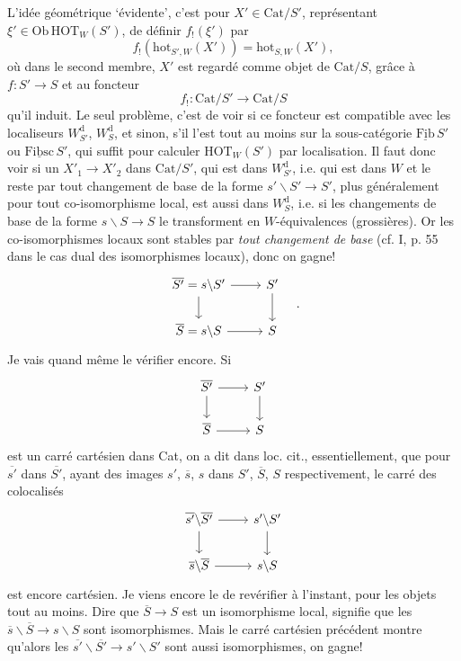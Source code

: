 \documentclass[11pt]{article}
\newcommand{\printedpage}[1]{\marginpar{\footnotesize p.~#1}}
\newcommand{\msp}[1]{\marginpar{\footnotesize [#1]}}
\newcommand{\HOT}{\mathrm{HOT}}
\newcommand{\Cat}{\mathrm{Cat}}
\newcommand{\Ob}{\mathrm{Ob}}
\newcommand{\hot}{\mathrm{hot}}
\newcommand{\uFib}{\underline{\mathrm{Fib}}}
\newcommand{\uFibsc}{\underline{\mathrm{Fibsc}}}
\begin{document}
L'idée géométrique `évidente', c'est pour $X'\in\Cat/S'$, représentant $\xi'\in\Ob\,\HOT_W(S')$, de définir $f_!(\xi')$ par
\[ f_!(\hot_{S',W}(X')) = \hot_{S,W}(X'), \]
où dans le second membre, $X'$ est regardé comme objet de $\Cat/S$, grâce à $f:S'\longrightarrow S$ et au foncteur
\[ f_! : \Cat/S' \longrightarrow \Cat/S \]
qu'il induit. Le seul problème, c'est de voir si ce foncteur est compatible avec les
\msp{page 135}
localiseurs $W_{S'}^{\mathrm{d}}$, $W_S^{\mathrm{d}}$, et sinon, s'il l'est tout au moins sur la sous-catégorie $\uFib\,S'$ ou $\uFibsc\,S'$, qui suffit pour calculer $\HOT_W(S')$ par localisation. Il faut donc voir si un $X'_1\longrightarrow X'_2$ dans $\Cat/S'$, qui est dans $W_{S'}^{\mathrm{d}}$, i.e. qui est dans $W$ et le reste par tout changement de base de la forme $s'\backslash S'\longrightarrow S'$, plus généralement pour tout co-isomorphisme local, est aussi dans $W_S^{\mathrm{d}}$, i.e. si les changements de base de la forme $s\backslash S\longrightarrow S$ le transforment en $W$-équivalences (grossières). Or les co-isomorphismes locaux sont stables par \textit{tout changement de base} (cf. I, p. 55 dans le cas dual des isomorphismes locaux), donc on gagne!
\[
\begin{tikzcd}
\overline{S'} = s\backslash S' \arrow[r] \arrow[d] & S' \arrow[d] \\
\overline{S} = s\backslash S \arrow[r] & S
\end{tikzcd}
\quad .
\]
Je vais quand même le vérifier encore. Si
\[
\begin{tikzcd}
\overline{S'} \arrow[r] \arrow[d] & S' \arrow[d] \\
\overline{S} \arrow[r] & S
\end{tikzcd}
\]
\printedpage{83}
est un carré cartésien dans Cat, on a dit dans loc. cit., essentiellement, que pour $\overline{s'}$ dans $\overline{S'}$, ayant des images $s'$, $\overline{s}$, $s$ dans $S'$, $\overline{S}$, $S$ respectivement, le carré des colocalisés
\[
\begin{tikzcd}
\overline{s'}\backslash\overline{S'} \arrow[r] \arrow[d] & s'\backslash S' \arrow[d] \\
\overline{s}\backslash\overline{S} \arrow[r] & s\backslash S
\end{tikzcd}
\]
est encore
\msp{page 136}
cartésien. Je viens encore le de revérifier à l'instant, pour les objets tout au moins. Dire que $\overline{S}\longrightarrow S$ est un isomorphisme local, signifie que les $\overline{s}\backslash\overline{S}\longrightarrow s\backslash S$ sont isomorphismes. Mais le carré cartésien précédent montre qu'alors les $\overline{s'}\backslash\overline{S'}\longrightarrow s'\backslash S'$ sont aussi isomorphismes, on gagne! %
\end{document}
